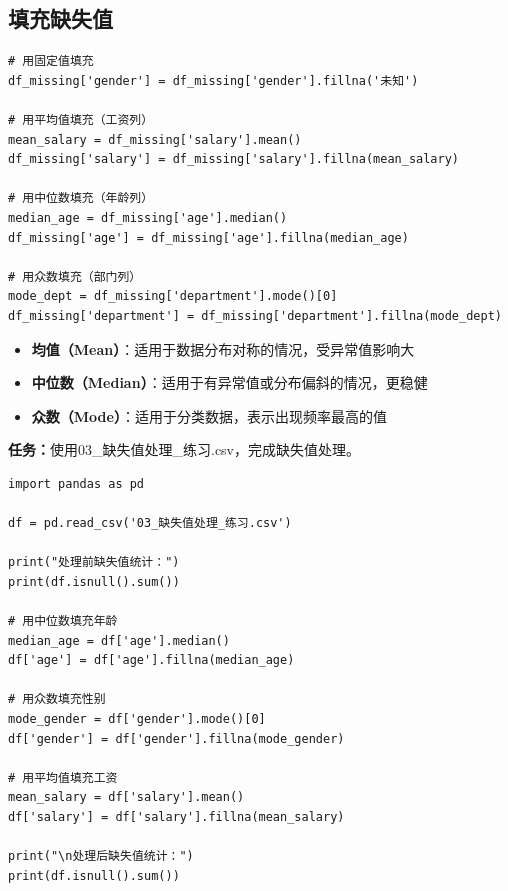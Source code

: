 \documentclass[12pt,a4paper]{article}
\begin{document}
\subsection{填充缺失值}

\begin{lstlisting}[caption={填充缺失值的方法}]
# 用固定值填充
df_missing['gender'] = df_missing['gender'].fillna('未知')

# 用平均值填充（工资列）
mean_salary = df_missing['salary'].mean()
df_missing['salary'] = df_missing['salary'].fillna(mean_salary)

# 用中位数填充（年龄列）
median_age = df_missing['age'].median()
df_missing['age'] = df_missing['age'].fillna(median_age)

# 用众数填充（部门列）
mode_dept = df_missing['department'].mode()[0]
df_missing['department'] = df_missing['department'].fillna(mode_dept)
\end{lstlisting}

\begin{theorybox}
\begin{itemize}
    \item \textbf{均值（Mean）}：适用于数据分布对称的情况，受异常值影响大
    \item \textbf{中位数（Median）}：适用于有异常值或分布偏斜的情况，更稳健
    \item \textbf{众数（Mode）}：适用于分类数据，表示出现频率最高的值
\end{itemize}
\end{theorybox}

\begin{practicebox}
\textbf{任务：}使用03\_缺失值处理\_练习.csv，完成缺失值处理。

\begin{lstlisting}
import pandas as pd

df = pd.read_csv('03_缺失值处理_练习.csv')

print("处理前缺失值统计：")
print(df.isnull().sum())

# 用中位数填充年龄
median_age = df['age'].median()
df['age'] = df['age'].fillna(median_age)

# 用众数填充性别
mode_gender = df['gender'].mode()[0]
df['gender'] = df['gender'].fillna(mode_gender)

# 用平均值填充工资
mean_salary = df['salary'].mean()
df['salary'] = df['salary'].fillna(mean_salary)

print("\n处理后缺失值统计：")
print(df.isnull().sum())
\end{lstlisting}
\end{practicebox}
\end{document}
